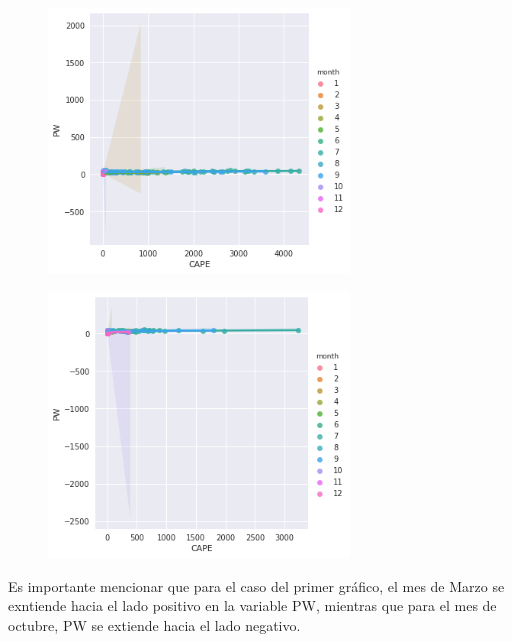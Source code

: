 \documentclass{article}
\begin{document}
\begin{figure}[htb]
    \begin{center}
    \includegraphics[width=8cm]{GFinal00z.png} 
    \end{center}
\end{figure}

\begin{figure}[htb]
    \begin{center}
    \includegraphics[width=8cm]{GFinal12Z.png} 
    \end{center}
\end{figure}

Es importante mencionar que para el caso del primer gráfico, el mes de Marzo se exntiende hacia el lado positivo en la variable PW, mientras que para el mes de octubre, PW se extiende hacia el lado negativo. 
\end{document}
